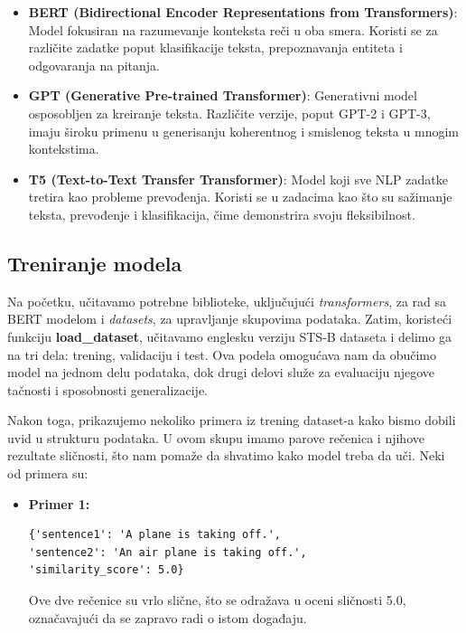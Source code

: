 \documentclass{article}
\begin{document}
\begin{itemize}
\item\textbf{BERT (Bidirectional Encoder Representations from Transformers)}:
Model fokusiran na razumevanje konteksta reči u oba smera. Koristi se za različite zadatke poput klasifikacije teksta, prepoznavanja entiteta i odgovaranja na pitanja.

\item\textbf{GPT (Generative Pre-trained Transformer)}:
Generativni model osposobljen za kreiranje teksta. Različite verzije, poput GPT-2 i GPT-3, imaju široku primenu u generisanju koherentnog i smislenog teksta u mnogim kontekstima.

\item\textbf{T5 (Text-to-Text Transfer Transformer)}:
Model koji sve NLP zadatke tretira kao probleme prevođenja. Koristi se u zadacima kao što su sažimanje teksta, prevođenje i klasifikacija, čime demonstrira svoju fleksibilnost.

\end{itemize}

\subsection{Treniranje modela}

Na početku, učitavamo potrebne biblioteke, uključujući \textit{transformers}, za rad sa BERT modelom i \textit{datasets}, za upravljanje skupovima podataka. Zatim, koristeći funkciju \textbf{load\_dataset}, učitavamo englesku verziju STS-B dataseta i delimo ga na tri dela: trening, validaciju i test. Ova podela omogućava nam da obučimo model na jednom delu podataka, dok drugi delovi služe za evaluaciju njegove tačnosti i sposobnosti generalizacije.

Nakon toga, prikazujemo nekoliko primera iz trening dataset-a kako bismo dobili uvid u strukturu podataka. U ovom skupu imamo parove rečenica i njihove rezultate sličnosti, što nam pomaže da shvatimo kako model treba da uči. Neki od primera su:

\begin{itemize} 
    \item \textbf{Primer 1:}
    \begin{lstlisting}
{'sentence1': 'A plane is taking off.', 
'sentence2': 'An air plane is taking off.', 
'similarity_score': 5.0}
    \end{lstlisting}
    Ove dve rečenice su vrlo slične, što se odražava u oceni sličnosti 5.0, označavajući da se zapravo radi o istom događaju.
\end{itemize}
\end{document}
